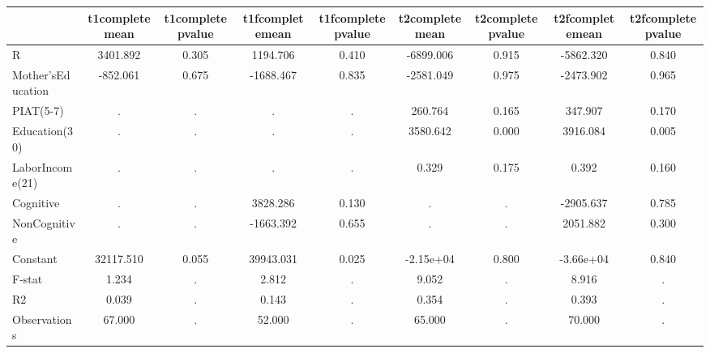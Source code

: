 \begin{table}[htbp]
\begin{tabular}{lcccccccc} \hline \hline
 & t1completemean  & t1completepvalue  & t1fcompletemean  & t1fcompletepvalue  & t2completemean  & t2completepvalue  & t2fcompletemean  & t2fcompletepvalue  \\  \hline 
R &  3401.892 &     0.305 &  1194.706 &     0.410 & -6899.006 &     0.915 & -5862.320 &     0.840 \\  
Mother'sEducation &  -852.061 &     0.675 & -1688.467 &     0.835 & -2581.049 &     0.975 & -2473.902 &     0.965 \\  
PIAT(5-7) &         . &         . &         . &         . &   260.764 &     0.165 &   347.907 &     0.170 \\  
Education(30) &         . &         . &         . &         . &  3580.642 &     0.000 &  3916.084 &     0.005 \\  
LaborIncome(21) &         . &         . &         . &         . &     0.329 &     0.175 &     0.392 &     0.160 \\  
Cognitive &         . &         . &  3828.286 &     0.130 &         . &         . & -2905.637 &     0.785 \\  
NonCognitive &         . &         . & -1663.392 &     0.655 &         . &         . &  2051.882 &     0.300 \\  
Constant & 32117.510 &     0.055 & 39943.031 &     0.025 & -2.15e+04 &     0.800 & -3.66e+04 &     0.840 \\  
F-stat &     1.234 &         . &     2.812 &         . &     9.052 &         . &     8.916 &         . \\  
R2 &     0.039 &         . &     0.143 &         . &     0.354 &         . &     0.393 &         . \\  
Observations &    67.000 &         . &    52.000 &         . &    65.000 &         . &    70.000 &         . \\  
\hline \hline \end{tabular}
\end{table}
